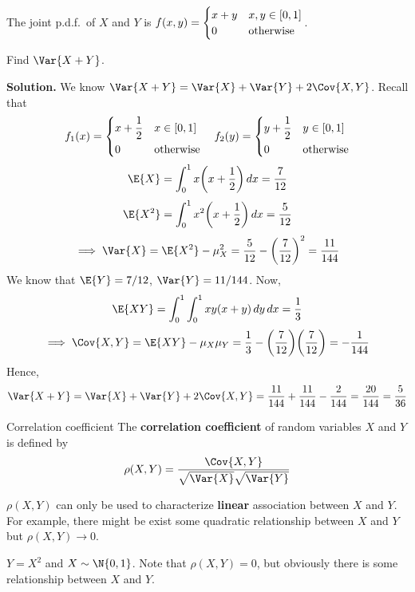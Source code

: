 \begin{Example}{}{}
    The joint p.d.f.\ of $ X $ and $ Y $ is
    $ f(x,y)=\begin{cases}
            x+y & x,y\in\interval{0}{1} \\
            0   & \text{otherwise}
        \end{cases} $.

    Find $ \Var{X+Y} $.

    \textbf{Solution.} We know $ \Var{X+Y}=\Var{X}+\Var{Y}+2\Cov{X,Y} $. Recall
    that
    \[ f_1(x)=\begin{dcases}
            x+\frac{1}{2} & x\in\interval{0}{1} \\
            0             & \text{otherwise}
        \end{dcases}\quad
        f_2(y)=\begin{dcases}
            y+\frac{1}{2} & y\in\interval{0}{1} \\
            0             & \text{otherwise}
        \end{dcases} \]
    \[ \E{X}=\int_{0}^{1} x\biggl( x+\frac{1}{2}  \biggr)\, d{x} =
        \frac{7}{12} \]
    \[ \E{X^2}=\int_{0}^{1} x^2\biggl( x+\frac{1}{2}  \biggr)\, d{x}=
        \frac{5}{12} \]
    \[ \implies\Var{X}=\E{X^2}-\mu_X^2=\frac{5}{12}-\biggl( \frac{7}{12} \biggr)^2=\frac{11}{144}  \]
    We know that $ \E{Y}=7/12 $, $ \Var{Y}=11/144 $. Now,
    \[ \E{XY}=
        \int_{0}^{1} \int_{0}^{1} x y(x+y)\, d{y}\, d{x}=\frac{1}{3}  \]
    \[ \implies \Cov{X,Y}=\E{XY}-\mu_X\mu_Y=
        \frac{1}{3} -\biggl( \frac{7}{12}  \biggr)\biggl( \frac{7}{12}  \biggr)=
        -\frac{1}{144}  \]
    Hence,
    \[ \Var{X+Y}=\Var{X}+\Var{Y}+2\Cov{X,Y}=
        \frac{11}{144} +\frac{11}{144} -\frac{2}{144} =\frac{20}{144}=\frac{5}{36} \]
\end{Example}
\begin{Definition}{Correlation coefficient}{}
    The \textbf{correlation coefficient} of
    random variables $ X $ and $ Y $ is defined by
    \[ \rho(X,Y)=\frac{\Cov{X,Y}}{\sqrt{\Var{X}}\sqrt{\Var{Y}}}  \]
\end{Definition}
\begin{Remark}{}{}
    $ \rho(X,Y) $ can only be used to characterize \textbf{linear} association
    between $ X $ and $ Y $. For example, there might be exist some quadratic
    relationship between $ X $ and $ Y $ but $ \rho(X,Y)\to 0 $.
\end{Remark}
\begin{Example}{}{}
    $ Y=X^2 $ and $ X \sim \N{0,1} $. Note that $ \rho(X,Y)=0 $,
    but obviously there is some relationship between $ X $ and $ Y $.
\end{Example}
